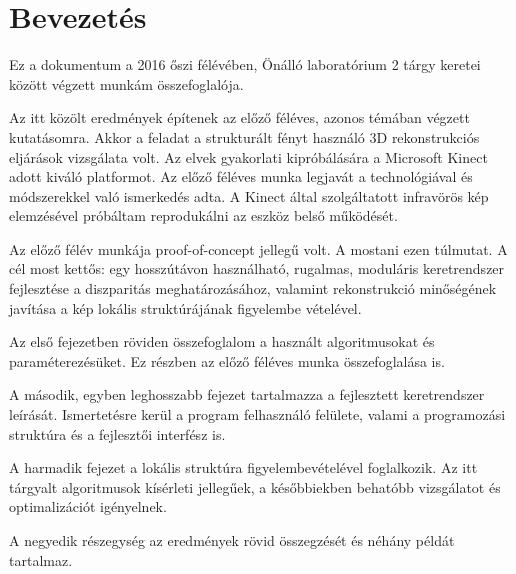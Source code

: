 \chapter*{Bevezetés}

Ez a dokumentum a 2016 őszi félévében, Önálló laboratórium 2 tárgy keretei között végzett munkám összefoglalója.

Az itt közölt eredmények építenek az előző féléves, azonos témában végzett kutatásomra.
Akkor a feladat a strukturált fényt használó 3D rekonstrukciós eljárások vizsgálata volt.
Az elvek gyakorlati kipróbálására a Microsoft Kinect adott kiváló platformot.
Az előző féléves munka legjavát a technológiával és módszerekkel való ismerkedés adta.
A Kinect által szolgáltatott infravörös kép elemzésével próbáltam reprodukálni az eszköz belső működését.

Az előző félév munkája proof-of-concept jellegű volt.
A mostani ezen túlmutat.
A cél most kettős: egy hosszútávon használható, rugalmas, moduláris keretrendszer fejlesztése a diszparitás meghatározásához, valamint rekonstrukció minőségének javítása a kép lokális struktúrájának figyelembe vételével.

Az első fejezetben röviden összefoglalom a használt algoritmusokat és paraméterezésüket.
Ez részben az előző féléves munka összefoglalása is.

A második, egyben leghosszabb fejezet tartalmazza a fejlesztett keretrendszer leírását.
Ismertetésre kerül a program felhasználó felülete, valami a programozási struktúra és a fejlesztői interfész is.

A harmadik fejezet a lokális struktúra figyelembevételével foglalkozik.
Az itt tárgyalt algoritmusok kísérleti jellegűek, a későbbiekben behatóbb vizsgálatot és optimalizációt igényelnek.

A negyedik részegység az eredmények rövid összegzését és néhány példát tartalmaz.
